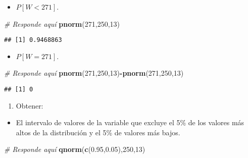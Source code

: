 \documentclass[
]{article}
\newenvironment{Shaded}{\begin{snugshade}}{\end{snugshade}}
\newcommand{\CommentTok}[1]{\textcolor[rgb]{0.56,0.35,0.01}{\textit{#1}}}
\newcommand{\DecValTok}[1]{\textcolor[rgb]{0.00,0.00,0.81}{#1}}
\newcommand{\FloatTok}[1]{\textcolor[rgb]{0.00,0.00,0.81}{#1}}
\newcommand{\KeywordTok}[1]{\textcolor[rgb]{0.13,0.29,0.53}{\textbf{#1}}}
\newcommand{\NormalTok}[1]{#1}
\newcommand{\OperatorTok}[1]{\textcolor[rgb]{0.81,0.36,0.00}{\textbf{#1}}}
\providecommand{\tightlist}{%
  \setlength{\itemsep}{0pt}\setlength{\parskip}{0pt}}
\begin{document}
\begin{itemize}
\tightlist
\item
  \(P [W < 271]\).
\end{itemize}

\begin{Shaded}
\begin{Highlighting}[]
\CommentTok{# Responde aquí}
\KeywordTok{pnorm}\NormalTok{(}\DecValTok{271}\NormalTok{,}\DecValTok{250}\NormalTok{,}\DecValTok{13}\NormalTok{)}
\end{Highlighting}
\end{Shaded}

\begin{verbatim}
## [1] 0.9468863
\end{verbatim}

\begin{itemize}
\tightlist
\item
  \(P [W = 271]\).
\end{itemize}

\begin{Shaded}
\begin{Highlighting}[]
\CommentTok{# Responde aquí}
\KeywordTok{pnorm}\NormalTok{(}\DecValTok{271}\NormalTok{,}\DecValTok{250}\NormalTok{,}\DecValTok{13}\NormalTok{)}\OperatorTok{-}\KeywordTok{pnorm}\NormalTok{(}\DecValTok{271}\NormalTok{,}\DecValTok{250}\NormalTok{,}\DecValTok{13}\NormalTok{)}
\end{Highlighting}
\end{Shaded}

\begin{verbatim}
## [1] 0
\end{verbatim}

\begin{enumerate}
\def\labelenumi{\arabic{enumi}.}
\setcounter{enumi}{1}
\tightlist
\item
  Obtener:
\end{enumerate}

\begin{itemize}
\tightlist
\item
  El intervalo de valores de la variable que excluye el 5\% de los
  valores más altos de la distribución y el 5\% de valores más bajos.
\end{itemize}

\begin{Shaded}
\begin{Highlighting}[]
\CommentTok{# Responde aquí}
\KeywordTok{qnorm}\NormalTok{(}\KeywordTok{c}\NormalTok{(}\FloatTok{0.95}\NormalTok{,}\FloatTok{0.05}\NormalTok{),}\DecValTok{250}\NormalTok{,}\DecValTok{13}\NormalTok{)}
\end{Highlighting}
\end{Shaded}
\end{document}
